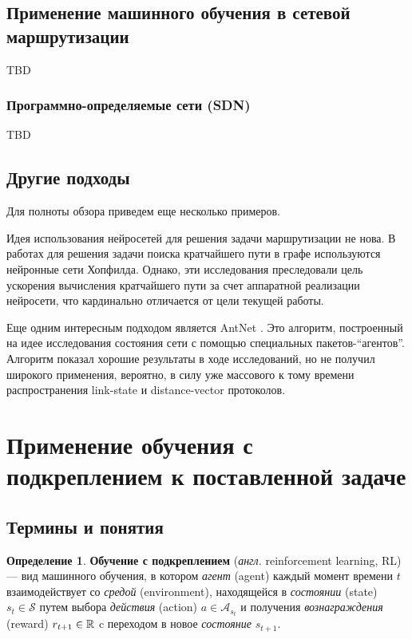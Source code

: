\documentclass[specification,annotation,times]{itmo-student-thesis}
\theoremstyle{definition}
\newtheorem{definition-ru}{Определение}
\begin{document}
\subsection{Применение машинного обучения в сетевой маршрутизации}

TBD

\subsubsection{Программно-определяемые сети (SDN)}

TBD

\subsection{Другие подходы}

Для полноты обзора приведем еще несколько примеров.

Идея использования нейросетей для решения задачи маршрутизации не нова. В
работах \cite{ali-nn-routing, araujo2001neural} для решения задачи поиска кратчайшего пути в графе
используются нейронные сети Хопфилда. Однако, эти исследования преследовали цель
ускорения вычисления кратчайшего пути за счет аппаратной реализации нейросети,
что кардинально отличается от цели текущей работы.

Еще одним интересным подходом является AntNet \cite{di1998antnet}. Это алгоритм,
построенный на идее исследования состояния сети с помощью специальных
пакетов-\enquote{агентов}. Алгоритм показал хорошие результаты в ходе исследований, но
не получил широкого применения, вероятно, в силу уже массового к тому времени
распространения link-state и distance-vector протоколов.

\section{Применение обучения с подкреплением к поставленной задаче}

\subsection{Термины и понятия}

\begin{definition-ru}
  \textbf{Обучение с подкреплением} (\textit{англ.} reinforcement learning, RL) --- вид машинного
  обучения, в котором \textit{агент} (agent) каждый момент времени $t$ 
  взаимодействует со \textit{средой} (environment), находящейся в
  \textit{состоянии} (state) $s_t \in \mathcal{S}$ путем выбора
  \textit{действия} (action) $a \in \mathcal{A}_{s_t}$ и получения
  \textit{вознаграждения} (reward) $r_{t+1} \in \Bbb{R}$ c переходом в новое
  \textit{состояние} $s_{t+1}$.
\end{definition-ru}
\end{document}
